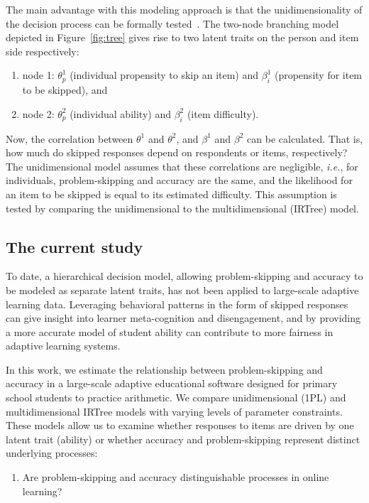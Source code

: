 \documentclass[11pt]{article}
\begin{document}
The main advantage with this modeling approach is that the unidimensionality of the decision process can be formally tested~\parencite{de2012irtrees}. The two-node branching model depicted in Figure~\ref{fig:tree} gives rise to two latent traits on the person and item side respectively: 
\begin{enumerate}
    \item node 1: $\theta_p^1$ (individual propensity to skip an item) and $\beta_i^1$ (propensity for item to be skipped), and 
    \item node 2: $\theta_p^2$ (individual ability) and $\beta_i^2$ (item difficulty).
\end{enumerate}
Now, the correlation between $\theta^1$ and $\theta^2$, and $\beta^1$ and $\beta^2$ can be calculated. That is, how much do skipped responses depend on respondents or items, respectively? The unidimensional model assumes that these correlations are negligible, \textit{i.e.}, for individuals, problem-skipping and accuracy are the same, and the likelihood for an item to be skipped is equal to its estimated difficulty. This assumption is tested by comparing the unidimensional to the multidimensional (IRTree) model. 

\subsection{The current study}
To date, a hierarchical decision model, allowing problem-skipping and accuracy to be modeled as separate latent traits, has not been applied to large-scale adaptive learning data.
Leveraging behavioral patterns in the form of skipped responses can give insight into learner meta-cognition and disengagement, and by providing a more accurate model of student ability can contribute to more fairness in adaptive learning systems. 

In this work, we estimate the relationship between problem-skipping and accuracy in a large-scale adaptive educational software designed for primary school students to practice arithmetic. We compare unidimensional (1PL) and multidimensional IRTree models with varying levels of parameter constraints. These models allow us to examine whether responses to items are driven by one latent trait (ability) or whether accuracy and problem-skipping represent distinct underlying processes:

\begin{enumerate}
    \item[\textbf{RQ1:}] Are problem-skipping and accuracy distinguishable processes in online learning?  
\end{enumerate}
\end{document}
